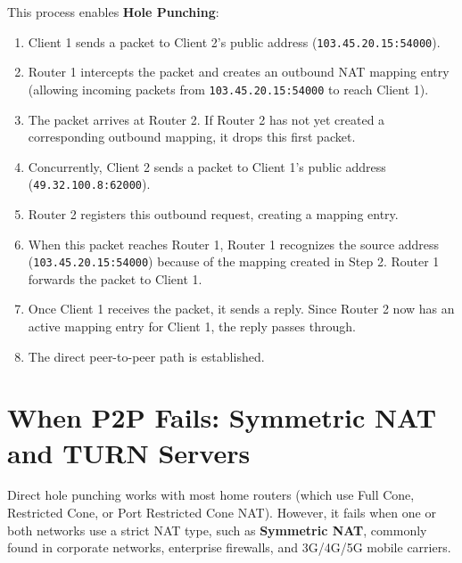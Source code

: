 \documentclass[11pt,a4paper]{article}
\begin{document}
This process enables \textbf{Hole Punching}:
\begin{enumerate}
    \item Client 1 sends a packet to Client 2's public address (\texttt{103.45.20.15:54000}).
    \item Router 1 intercepts the packet and creates an outbound NAT mapping entry (allowing incoming packets from \texttt{103.45.20.15:54000} to reach Client 1).
    \item The packet arrives at Router 2. If Router 2 has not yet created a corresponding outbound mapping, it drops this first packet.
    \item Concurrently, Client 2 sends a packet to Client 1's public address (\texttt{49.32.100.8:62000}).
    \item Router 2 registers this outbound request, creating a mapping entry.
    \item When this packet reaches Router 1, Router 1 recognizes the source address (\texttt{103.45.20.15:54000}) because of the mapping created in Step 2. Router 1 forwards the packet to Client 1.
    \item Once Client 1 receives the packet, it sends a reply. Since Router 2 now has an active mapping entry for Client 1, the reply passes through.
    \item The direct peer-to-peer path is established.
\end{enumerate}

\newpage

\section{When P2P Fails: Symmetric NAT and TURN Servers}

Direct hole punching works with most home routers (which use Full Cone, Restricted Cone, or Port Restricted Cone NAT). However, it fails when one or both networks use a strict NAT type, such as \textbf{Symmetric NAT}, commonly found in corporate networks, enterprise firewalls, and 3G/4G/5G mobile carriers.
\end{document}

